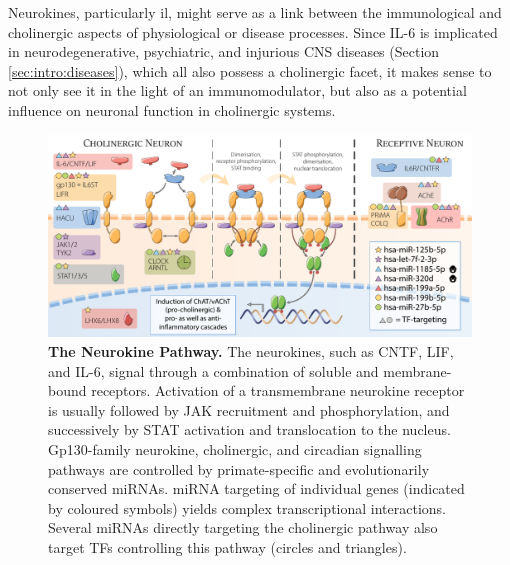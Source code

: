 Neurokines, particularly \ac{il}, might serve as a link between the immunological and cholinergic aspects of physiological or disease processes. Since IL-6 is implicated in neurodegenerative, psychiatric, and injurious CNS diseases (Section \ref{sec:intro:diseases}), which all also possess a cholinergic facet, it makes sense to not only see it in the light of an immunomodulator, but also as a potential influence on neuronal function in cholinergic systems.

\begin{figure}
\includegraphics[width=\textwidth]{figures/neurokine}
\caption[The Neurokine Pathway.]{\textbf{The Neurokine Pathway.} The neurokines, such as CNTF, LIF, and IL-6, signal through a combination of soluble and membrane-bound receptors. Activation of a transmembrane neurokine receptor is usually followed by JAK recruitment and phosphorylation, and successively by STAT activation and translocation to the nucleus. Gp130-family neurokine, cholinergic, and circadian signalling pathways are controlled by primate-specific and evolutionarily conserved miRNAs. miRNA targeting of individual genes (indicated by coloured symbols) yields complex transcriptional interactions. Several miRNAs directly targeting the cholinergic pathway also target TFs controlling this pathway (circles and triangles).
\label{fig:neurokine}}
\end{figure}


